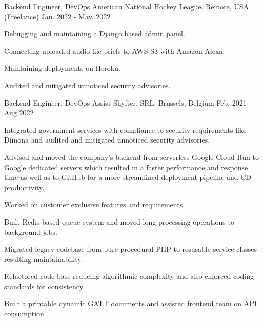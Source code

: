 \begin{cventries}
  \cventry
    {Backend Engineer, DevOps} %
    {American National Hockey League.} %
    {Remote, USA (Freelance)} %
    {Jan. 2022 - May. 2022} %
    {
      \begin{cvitems} %
        \item {Debugging and maintaining a Django based admin panel.}
        \item {Connecting uploaded audio file briefs to AWS S3 with Amazon Alexa.}
        \item {Maintaining deployments on Heroku.}
        \item {Audited and mitigated unnoticed security advisories.}
      \end{cvitems}
    }

  \cventry
    {Backend Engineer, DevOps Assist} %
    {Shyfter, SRL.} %
    {Brussels, Belgium} %
    {Feb. 2021 - Aug 2022} %
    {
      \begin{cvitems} %
        \item {Integrated government services with compliance to security requirements like Dimona and audited and mitigated unnoticed security advisories.}
        \item {Advised and moved the company's backend from serverless Google Cloud Run to Google dedicated servers which resulted in a faster performance and response time as well as to GitHub for a more streamlined deployment pipeline and CD productivity.}
        \item {Worked on customer exclusive features and requirements.}
        \item {Built Redis based queue system and moved long processing operations to background jobs.}
        \item {Migrated legacy codebase from pure procedural PHP to resusable service classes resulting maintainability.}
        \item {Refactored code base reducing algorithmic complexity and also enforced coding standards for consistency.}
        \item {Built a printable dynamic GATT documents and assisted frontend team on API consumption.}
      \end{cvitems}
    }


\end{cventries}
